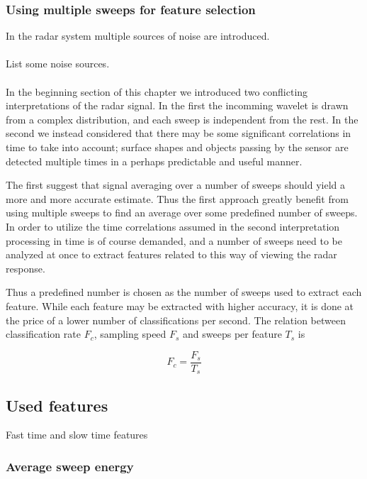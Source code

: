 \documentclass[a4paper, 12pt]{article}
\begin{document}
\subsubsection{Using multiple sweeps for feature selection}

In the radar system multiple sources of noise are introduced.
\\ \\
List some noise sources.
\\ \\
In the beginning section of this chapter we introduced two conflicting interpretations of the radar signal. In the first the incomming wavelet is drawn from a complex distribution, and each sweep is independent from the rest. In the second we instead considered that there may be some significant correlations in time to take into account; surface shapes and objects passing by the sensor are detected multiple times in a perhaps predictable and useful manner.  

The first suggest that signal averaging over a number of sweeps should yield a more and more accurate estimate. Thus the first approach greatly benefit from using multiple sweeps to find an average over some predefined number of sweeps.  In order to utilize the time correlations assumed in the second interpretation processing in time is of course demanded, and a number of sweeps need to be analyzed at once to extract features related to this way of viewing the radar response. 

Thus a predefined number is chosen as the number of sweeps used to extract each feature. While each feature may be extracted with higher accuracy, it is done at the price of a lower number of classifications per second. The relation between classification rate $F_c$, sampling speed $F_s$ and sweeps per feature $T_s$ is

\begin{equation}
	F_c = \frac{F_s}{T_s}
\end{equation}


\subsection{Used features}

Fast time and slow time features 

\subsubsection{Average sweep energy}
\end{document}
